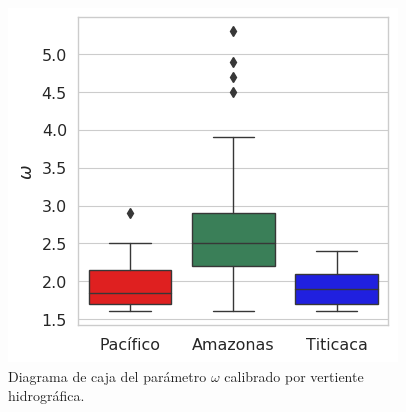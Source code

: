 \begin{figure}[htb]
	\includegraphics[scale=.75]{Images/08_omega_boxplot.png}
	\centering
	\caption{Diagrama de caja del parámetro $\omega$ calibrado por vertiente hidrográfica.}
	\label{fig:08_omega_boxplot}
\end{figure}
